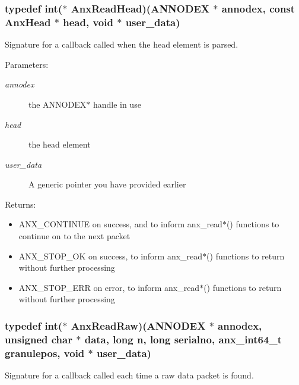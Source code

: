 \subsubsection{\setlength{\rightskip}{0pt plus 5cm}typedef int($\ast$ {\bf Anx\-Read\-Head})({\bf ANNODEX} $\ast$ annodex, const Anx\-Head $\ast$ head, void $\ast$ user\_\-data)}\label{anx__read_8h_a2}


Signature for a callback called when the head element is parsed. 

\begin{Desc}
\item[Parameters:]
\begin{description}
\item[{\em annodex}]the ANNODEX$\ast$ handle in use \item[{\em head}]the head element \item[{\em user\_\-data}]A generic pointer you have provided earlier \end{description}
\end{Desc}
\begin{Desc}
\item[Returns:]\begin{itemize}
\item ANX\_\-CONTINUE on success, and to inform anx\_\-read$\ast$() functions to continue on to the next packet\item ANX\_\-STOP\_\-OK on success, to inform anx\_\-read$\ast$() functions to return without further processing\item ANX\_\-STOP\_\-ERR on error, to inform anx\_\-read$\ast$() functions to return without further processing \end{itemize}
\end{Desc}
\subsubsection{\setlength{\rightskip}{0pt plus 5cm}typedef int($\ast$ {\bf Anx\-Read\-Raw})({\bf ANNODEX} $\ast$ annodex, unsigned char $\ast$ data, long n, long serialno, {\bf anx\_\-int64\_\-t} granulepos, void $\ast$ user\_\-data)}\label{anx__read_8h_a4}


Signature for a callback called each time a raw data packet is found. 

